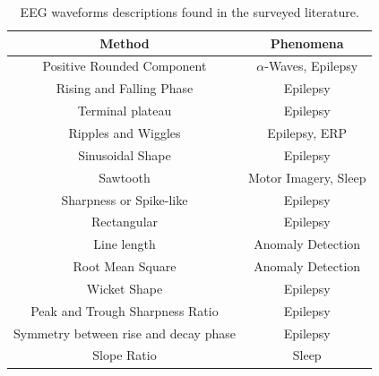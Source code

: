 \documentclass[aspectratio=169]{beamer}
\begin{document}
\begin{frame}  
\begin{table}[h!]
\caption{EEG waveforms descriptions found in the surveyed literature.}
\centering
\begin{tabular}{cc}
\toprule
\textbf{Method}	& \textbf{Phenomena} 	\\
\midrule
Positive Rounded Component                    & $\alpha$-Waves, Epilepsy  \\
Rising and Falling Phase      & Epilepsy  \\
Terminal plateau      & Epilepsy  \\
Ripples and Wiggles     & Epilepsy, ERP  \\
Sinusoidal Shape        & Epilepsy  \\
Sawtooth                     & Motor Imagery, Sleep  \\
Sharpness or Spike-like     & Epilepsy  \\
Rectangular     & Epilepsy  \\
Line length       & Anomaly Detection\\
Root Mean Square & Anomaly Detection \\
Wicket Shape     & Epilepsy \\
Peak and Trough Sharpness Ratio     & Epilepsy \\
Symmetry between rise and decay phase     & Epilepsy  \\
Slope Ratio    & Sleep  \\
\bottomrule
\end{tabular}
\label{tab:methods}
\end{table}
\end{frame}  
\end{document}
